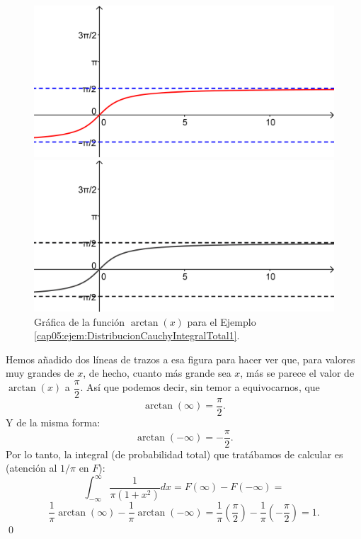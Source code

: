 \begin{ejemplo}
\begin{figure}[htbp]
\begin{center}
\begin{enColor}
\includegraphics[width=12cm]{../fig/Cap05-GraficaArcoTangente.png}
\end{enColor}
\begin{bn}
\includegraphics[width=12cm]{../fig/Cap05-GraficaArcoTangente-bn.png}
\end{bn}
\caption{Gráfica de la función $\arctan(x)$ para el Ejemplo \ref{cap05:ejem:DistribucionCauchyIntegralTotal1}.}
\label{cap05:fig:Cap05-GraficaArcoTangente}
\end{center}
\end{figure}

    Hemos añadido dos líneas de trazos a esa figura para hacer ver que, para valores muy grandes de $x$, de hecho, cuanto más grande sea $x$, más se parece el valor de $\arctan(x)$ a $\dfrac{\pi}{2}$. Así que podemos decir, sin temor a equivocarnos, que
    \[\arctan(\infty)=\dfrac{\pi}{2}.\]
    Y de la misma forma:
    \[\arctan(-\infty)=-\dfrac{\pi}{2}.\]
    Por lo tanto, la integral (de probabilidad total) que tratábamos de calcular es (atención al $1/\pi$ en $F$):
    \[\int_{-\infty}^{\infty}\dfrac{1}{\pi(1+x^2)}dx=F(\infty)-F(-\infty)=\]
    \[\dfrac{1}{\pi}\arctan(\infty)-\dfrac{1}{\pi}\arctan(-\infty)=
    \dfrac{1}{\pi}\left(\dfrac{\pi}{2}\right)-\dfrac{1}{\pi}\left(-\dfrac{\pi}{2}\right)=1.\]
    \qed
\end{ejemplo}
